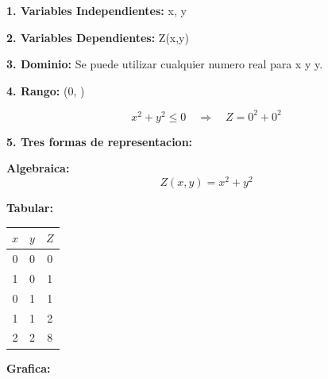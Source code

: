 \documentclass[12pt]{article}
\begin{document}
\begin{justify}
\begin{justify}
\begin{justify}
\begin{justify}
\begin{justify}
\begin{justify}
\begin{justify}
\begin{justify}
{\textbf{1. Variables Independientes:}} {\small x, y}
\vspace{0.01cm}
\end{justify}

\begin{justify}
{\textbf{2. Variables Dependientes:}} {\small Z(x,y)}
\vspace{0.01cm}
\end{justify}

\begin{justify}
{\textbf{3. Dominio:}} {\small Se puede utilizar cualquier numero real para x y y.}
\vspace{0.01cm}
\end{justify}

\begin{justify}
{\textbf{4. Rango:}} \small (0, \infty) 
\vspace{0.01cm}
\end{justify}

\begin{justify}
    \[ x^2+y^2 \leq 0 \quad \Longrightarrow \quad Z=0^2+0^2 \]
\end{justify}

\begin{justify}
   {\textbf{5. Tres formas de representacion:}}
   \vspace{0.01cm}
\end{justify}

\begin{justify}
    \small\textbf {Algebraica: } \small
\[Z(x,y) = x^2+y^2\]
\end{justify}

\begin{justify}
\small\textbf {Tabular: }
\begin{tabular}{|c|c|c|}
\hline
\textbf{$x$} & \textbf{$y$} & \textbf{$Z$} \\ \hline
0 & 0 & 0 \\ \hline
1 & 0 & 1 \\ \hline
0 & 1 & 1 \\ \hline
1 & 1 & 2 \\ \hline
2 & 2 & 8 \\ \hline
\end{tabular}
\end{justify}

\begin{justify}
\small\textbf {Grafica: }
\end{justify}


\end{justify}
\end{justify}
\end{justify}
\end{justify}
\end{justify}
\end{justify}
\end{justify}
\end{document}
